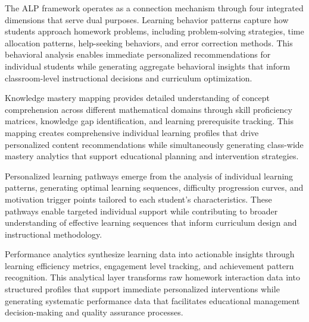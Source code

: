\documentclass[conference]{IEEEtran}
\begin{document}
\begin{IEEEkeywords}
The ALP framework operates as a connection mechanism through four integrated dimensions that serve dual purposes. Learning behavior patterns capture how students approach homework problems, including problem-solving strategies, time allocation patterns, help-seeking behaviors, and error correction methods. This behavioral analysis enables immediate personalized recommendations for individual students while generating aggregate behavioral insights that inform classroom-level instructional decisions and curriculum optimization.

Knowledge mastery mapping provides detailed understanding of concept comprehension across different mathematical domains through skill proficiency matrices, knowledge gap identification, and learning prerequisite tracking. This mapping creates comprehensive individual learning profiles that drive personalized content recommendations while simultaneously generating class-wide mastery analytics that support educational planning and intervention strategies.

Personalized learning pathways emerge from the analysis of individual learning patterns, generating optimal learning sequences, difficulty progression curves, and motivation trigger points tailored to each student's characteristics. These pathways enable targeted individual support while contributing to broader understanding of effective learning sequences that inform curriculum design and instructional methodology.

Performance analytics synthesize learning data into actionable insights through learning efficiency metrics, engagement level tracking, and achievement pattern recognition. This analytical layer transforms raw homework interaction data into structured profiles that support immediate personalized interventions while generating systematic performance data that facilitates educational management decision-making and quality assurance processes.


\end{IEEEkeywords}
\end{document}
